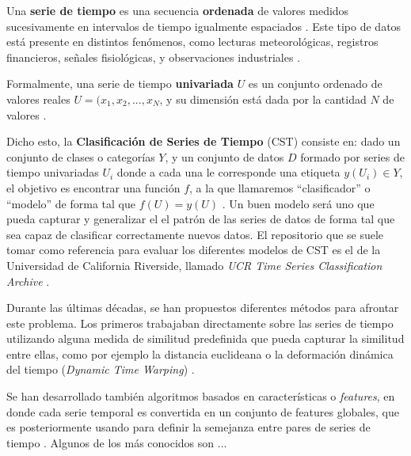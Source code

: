 \documentclass[../../main.tex]{subfiles}
\begin{document}
Una \textbf{serie de tiempo} es una secuencia \textbf{ordenada} de valores medidos sucesivamente en intervalos de tiempo igualmente espaciados \cite{khan2021-bilstm-for-unitsc}. Este tipo de datos está presente en distintos fenómenos, como lecturas meteorológicas, registros financieros, señales fisiológicas, y observaciones industriales \cite{wang2016timeseriesclassificationscratch}. 

Formalmente, una serie de tiempo \textbf{univariada} \(U\) es un conjunto ordenado de valores reales \(U = (x_1, x_2, ..., x_N\), y su dimensión está dada por la cantidad \(N\) de valores \cite{khan2021-bilstm-for-unitsc}.

Dicho esto, la \textbf{Clasificación de Series de Tiempo} (CST) consiste en: dado un conjunto de clases o categorías \(Y\), y un conjunto de datos \(D\) formado por series de tiempo univariadas \(U_i\) donde a cada una le corresponde una etiqueta \(y(U_i) \in Y\), el objetivo es encontrar una función \(f\), a la que llamaremos ``clasificador'' o ``modelo'' de forma tal que \(f(U) = y(U)\) \cite{khan2021-bilstm-for-unitsc}. Un buen modelo será uno que pueda capturar y generalizar el el patrón de las series de datos de forma tal que sea capaz de clasificar correctamente nuevos datos. El repositorio que se suele tomar como referencia para evaluar los diferentes modelos de CST es el de la Universidad de California Riverside, llamado \textit{UCR Time Series Classification Archive} \cite{UCRArchive2018}.

Durante las últimas décadas, se han propuestos diferentes métodos para afrontar este problema. Los primeros trabajaban directamente sobre las series de tiempo utilizando alguna medida de similitud predefinida que pueda capturar la similitud entre ellas, como por ejemplo la distancia euclideana o la deformación dinámica del tiempo (\textit{Dynamic Time Warping}) \cite{wang2016timeseriesclassificationscratch}. 

Se han desarrollado también algoritmos basados en características o \textit{features}, en donde cada serie temporal es convertida en un conjunto de features globales, que es posteriormente usando para definir la semejanza entre pares de series de tiempo \cite{khan2021-bilstm-for-unitsc}. Algunos de los más conocidos son ...
\end{document}
